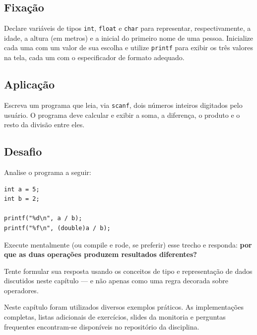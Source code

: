 \documentclass[12pt,a4paper,oneside]{extreport}
\begin{document}
\begin{exercicio}

\subsection*{Fixação}
Declare variáveis de tipos \texttt{int}, \texttt{float} e \texttt{char} para representar, respectivamente, a idade, a altura (em metros) e a inicial do primeiro nome de uma pessoa. Inicialize cada uma com um valor de sua escolha e utilize \texttt{printf} para exibir os três valores na tela, cada um com o especificador de formato adequado.


\subsection*{Aplicação}
Escreva um programa que leia, via \texttt{scanf}, dois números inteiros digitados pelo usuário. O programa deve calcular e exibir a soma, a diferença, o produto e o resto da divisão entre eles.


\subsection*{Desafio}
Analise o programa a seguir:

\begin{lstlisting}
int a = 5;
int b = 2;

printf("%d\n", a / b);
printf("%f\n", (double)a / b);
\end{lstlisting}

Execute mentalmente (ou compile e rode, se preferir) esse trecho e responda: \textbf{por que as duas operações produzem resultados diferentes?}

Tente formular sua resposta usando os conceitos de tipo e representação de dados discutidos neste capítulo — e não apenas como uma regra decorada sobre operadores.


\end{exercicio}



\begin{tcolorbox}[title=Material Complementar]

Neste capítulo foram utilizados diversos exemplos práticos. As implementações completas, listas adicionais de exercícios, slides da monitoria e perguntas frequentes encontram-se disponíveis no repositório da disciplina.

\end{tcolorbox}
\end{document}
